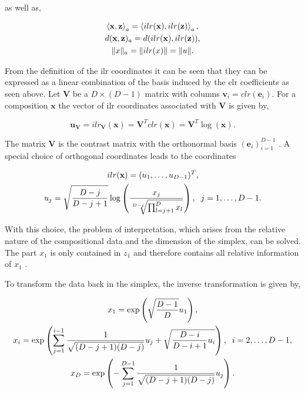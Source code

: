 as well as,

\begin{gather*}
\left\langle  \textbf{x},\textbf{z} \right\rangle_a = \left\langle  ilr(\textbf{x}), ilr(\textbf{z}) \right\rangle_a, \\
d(\textbf{x},\textbf{z})_a = d(ilr(\textbf{x}),ilr(\textbf{z})),\\
\lVert x\rVert_a = \lVert ilr(x)\rVert = \lVert u\rVert .
\label{eq:ilr coordinates isometric }
\end{gather*}


From the definition of the ilr coordinates it can be seen that they can be expressed as a linear combination of the basis induced by the clr coefficients as seen above. Let $\textbf{V}$ be a $D \times (D-1)$ matrix with columns $\textbf{v}_i = clr(\textbf{e}_i)$. For a composition $\textbf{x}$ the vector of ilr coordinates associated with $\textbf{V}$ is given by,

\begin{equation*}
\textbf{u}_{\textbf{V}} = ilr_{\textbf{V}}(\textbf{x}) = \textbf{V}^T clr(\textbf{x}) = \textbf{V}^T \log(\textbf{x}). 
\label{eq:ilr coordinates with V}
\end{equation*}

The matrix $\textbf{V}$ is the contrast matrix with the orthonormal basis $(\textbf{e}_i)_{i=1}^{D-1}$ \cite{Egozcue:2003}. A special choice of orthogonal coordinates leads to the coordinates 

\begin{gather*}
ilr(\textbf{x}) = (u_1,\ldots,u_{D-1})^T, \\
u_j = \sqrt{\frac{D-j}{D-j+1}}\log\left(\frac{x_j}{\sqrt[D-j]{\prod_{l=j+1}^D x_l}}\right), \hspace{0.2cm} j=1,\ldots, D-1 .
\label{eq:pivot coordinates}
\end{gather*}

With this choice, the problem of interpretation, which arises from the relative nature of the compositional data and the dimension of the simplex, can be solved. The part $x_1$ is only contained in $z_1$ and therefore contains all relative information of $x_1$ \cite{Filzmoser:2020}. 

To transform the data back in the simplex, the inverse transformation is given by, 

\begin{gather*}
x_1 = \exp\left(\sqrt{\frac{D-1}{D}}u_1\right), \\
x_i = \exp\left( \sum_{j=1}^{i-1}\frac{1}{\sqrt{(D-j+1)(D-j)}}u_j + \sqrt{\frac{D-i}{D-i+1}u_i} \right), \hspace{0.2cm} i=2,\ldots, D-1, \\
x_D = \exp\left(- \sum_{j=1}^{D-1} \frac{1}{\sqrt{(D-j+1)(D-j)}}u_j \right).
\label{eq: Inverse Transformation}
\end{gather*}


